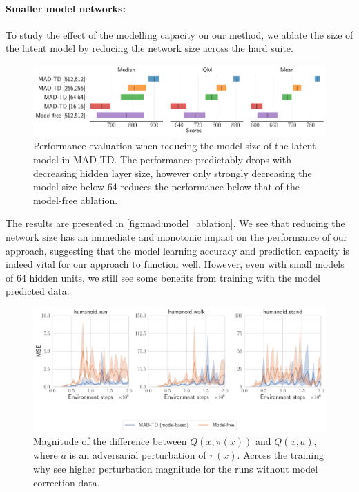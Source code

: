 \paragraph{Smaller model networks:}To study the effect of the modelling capacity on our method, we ablate the size of the latent model by reducing the network size across the hard suite.
\begin{figure}[b]
    \centering
    \includegraphics[width=1.0\linewidth]{figures/mad-td/model_ablation_rliable.pdf}
    \caption{Performance evaluation when reducing the model size of the latent model in MAD-TD. The performance predictably drops with decreasing hidden layer size, however only strongly decreasing the model size below 64 reduces the performance below that of the model-free ablation.}
    \label{fig:mad:model_ablation}
\end{figure}
The results are presented in \autoref{fig:mad:model_ablation}.
We see that reducing the network size has an immediate and monotonic impact on the performance of our approach, suggesting that the model learning accuracy and prediction capacity is indeed vital for our approach to function well.
However, even with small models of 64 hidden units, we still see some benefits from training with the model predicted data.

\begin{figure}[t]
    \centering
    \includegraphics[width=0.75\linewidth]{figures/mad-td/adv_examples.pdf}
    \caption{Magnitude of the difference between $Q(x,\pi(x))$ and $Q(x,\tilde{a})$, where $\tilde{a}$ is an adversarial perturbation of $\pi(x)$. Across the training why see higher perturbation magnitude for the runs without model correction data.}
    \label{fig:mad:adv}
\end{figure}

